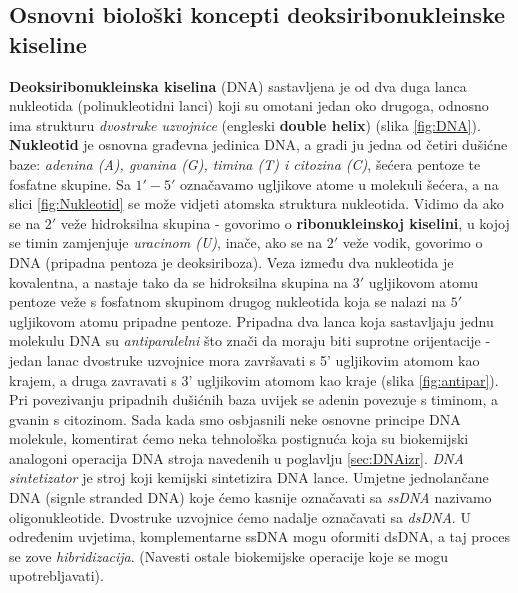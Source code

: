 \documentclass[a4paper,oneside,12pt]{memoir} %
\begin{document}
\begin{spacing}{1.5}
\section{Osnovni biološki koncepti deoksiribonukleinske kiseline}
\textbf{Deoksiribonukleinska kiselina} (DNA) sastavljena je od dva duga lanca nukleotida (polinukleotidni lanci) koji su omotani jedan oko drugoga, odnosno ima strukturu \textit{dvostruke uzvojnice }(engleski \textbf{double helix}) (slika \ref{fig:DNA}). \textbf{Nukleotid} je osnovna građevna jedinica DNA, a gradi ju jedna od četiri dušićne baze: \textit{adenina (A), gvanina (G), timina (T) i citozina (C)}, šećera pentoze te fosfatne skupine. Sa $1' - 5'$ označavamo ugljikove atome u molekuli šećera, a na slici \ref{fig:Nukleotid} se može vidjeti atomska struktura nukleotida. Vidimo da ako se na $2'$ veže hidroksilna skupina - govorimo o \textbf{ribonukleinskoj kiselini}, u kojoj se timin zamjenjuje \textit{uracinom (U)}, inače, ako se na $2'$ veže vodik, govorimo o DNA (pripadna pentoza je deoksiriboza). Veza između dva nukleotida je kovalentna, a nastaje tako da se hidroksilna skupina na $3'$ ugljikovom atomu pentoze veže s fosfatnom skupinom drugog nukleotida koja se nalazi na $5'$ ugljikovom atomu pripadne pentoze. Pripadna dva lanca koja sastavljaju jednu molekulu DNA su \textit{antiparalelni} što znači da moraju biti suprotne orijentacije - jedan lanac dvostruke uzvojnice mora završavati s 5' ugljikovim atomom kao krajem, a druga zavravati s 3' ugljikovim atomom kao kraje (slika \ref{fig:antipar}). Pri povezivanju pripadnih dušićnih baza uvijek se adenin povezuje s timinom, a gvanin s citozinom. Sada kada smo osbjasnili neke osnovne principe DNA molekule, komentirat ćemo neka tehnološka postignuća koja su biokemijski analogoni operacija DNA stroja navedenih u poglavlju \ref{sec:DNAizr}.
\textit{DNA sintetizator} je stroj koji kemijski sintetizira DNA lance. Umjetne jednolančane DNA (signle stranded DNA) koje ćemo kasnije označavati sa \textit{ssDNA} nazivamo oligonukleotide. Dvostruke uzvojnice ćemo nadalje označavati sa \textit{dsDNA}. U određenim uvjetima, komplementarne ssDNA mogu oformiti dsDNA, a taj proces se zove \textit{hibridizacija}. (Navesti ostale biokemijske operacije koje se mogu upotrebljavati).


\end{spacing}
\end{document}
